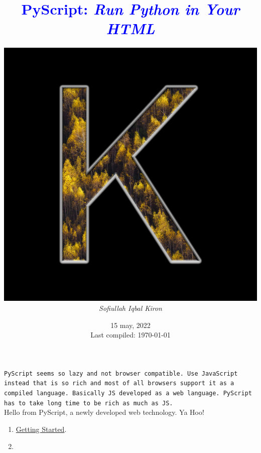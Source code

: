 \documentclass[12 pt, letterpaper]{extarticle}
\title{\textcolor{blue}{PyScript: \textit{Run Python in Your HTML}}}
\author
{
	\includegraphics[scale=0.2]{User Profile.jpg} \\ %
	\textit{Sofiullah Iqbal Kiron} \\
	\R{\rule{11 cm}{2 pt}}
}
\date{15 may, 2022 \\ {\tiny Last compiled: \today}}
\begin{document}
	
\maketitle

\texttt{PyScript seems so lazy and not browser compatible. Use JavaScript instead that is so rich and most of all browsers support it as a compiled language. Basically JS developed as a web language. PyScript has to take long time to be rich as much as JS.}\\

Hello from PyScript, a newly developed web technology. Ya Hoo!

\begin{enumerate}
	\item \href{https://github.com/pyscript/pyscript/blob/main/GETTING-STARTED.md}{Getting Started}.
	\item 
\end{enumerate}
\end{document}
